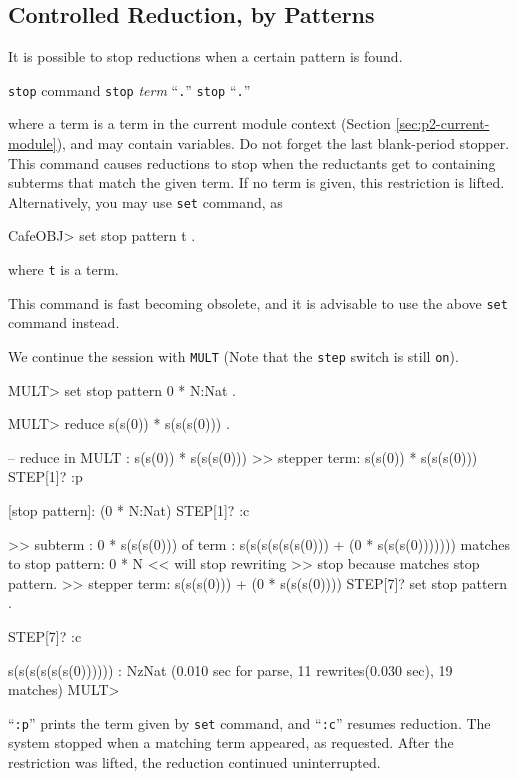 \documentclass[a4paper]{memoir}
\begin{document}
\subsection{Controlled Reduction, by Patterns}
\label{sec:p2-control-reduction-pat}

It is possible to stop reductions when a certain pattern is
found.

\begin{bsyntax} \texttt{stop} command  \Hline
\texttt{stop} \textit{term} ``\texttt{.}''
\texttt{stop} ``\texttt{.}''
\end{bsyntax}

where a term is a term in the current module context
(Section \ref{sec:p2-current-module}), and may contain variables.
Do not forget the last blank-period stopper. This command causes
reductions to stop when the reductants get to containing subterms
that match the given term.
If no term is given, this restriction is lifted.
Alternatively, you may use \verb|set| command,
as
\begin{vvtm}
\begin{ccode}
  CafeOBJ> set stop pattern t .
\end{ccode}
\end{vvtm}
where \verb|t| is a term.

\begin{warning}
  This command is fast becoming obsolete, and it is advisable to
  use the above \verb|set| command instead.
\end{warning}

We continue the session with \verb|MULT| (Note that the \verb|step|
switch is still \verb|on|).
\begin{vvtm}
\begin{ccode}
  MULT> set stop pattern 0 * N:Nat .

  MULT> reduce s(s(0)) * s(s(s(0))) .

  -- reduce in MULT : s(s(0)) * s(s(s(0)))
  >> stepper term: s(s(0)) * s(s(s(0)))
  STEP[1]? :p

  [stop pattern]: (0 * N:Nat)
  STEP[1]? :c

  >> subterm : 0 * s(s(s(0)))
     of term : s(s(s(s(s(s(0))) + (0 * s(s(s(0)))))))
     matches to stop pattern: 0 * N
  << will stop rewriting
  >> stop because matches stop pattern.
  >> stepper term: s(s(s(0))) + (0 * s(s(s(0))))
  STEP[7]? set stop pattern .

  STEP[7]? :c

  s(s(s(s(s(s(0)))))) : NzNat
  (0.010 sec for parse, 11 rewrites(0.030 sec), 19 matches)
  MULT>
\end{ccode}
\end{vvtm}
``\verb|:p|'' prints the term given by \verb|set| command, and
``\verb|:c|'' resumes reduction. The system stopped when a matching
term appeared, as requested. After the restriction was lifted, the
reduction continued uninterrupted.
\end{document}

